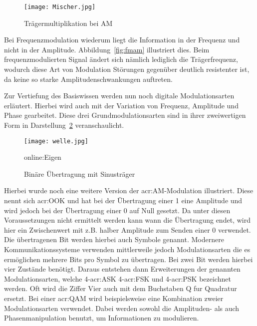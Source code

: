 \begin{figure}[H]
	\centering
	\texttt{[image: Mischer.jpg]}
	\caption[Trägermultiplikation bei AM]{Trägermultiplikation bei AM} 
	\cite{wernerNachrichtentechnikEinfuehrungFuer2010}
	\label{fig:mischer}
\end{figure}

Bei Frequenzmodulation wiederum liegt die Information in der Frequenz und nicht in der Amplitude. Abbildung~\ref{fig:fmam} illustriert dies. Beim frequenzmodulierten Signal ändert sich nämlich lediglich die Trägerfrequenz, wodurch diese Art von Modulation Störungen gegenüber deutlich resistenter ist, da keine so starke Amplitudenschwankungen auftreten.\cite{hoeher}


Zur Vertiefung des Basiswissen werden nun noch digitale Modulationsarten erläutert. Hierbei wird auch mit der Variation von Frequenz, Amplitude und Phase gearbeitet. Diese drei Grundmodulationsarten sind in ihrer zweiwertigen Form in Darstellung~\ref{fig:welle} veranschaulicht.

\begin{figure}[H]
	\centering
	\texttt{[image: welle.jpg]}
	\caption[Binäre Übertragung mit Sinusträger]{Binäre Übertragung mit Sinusträger} 
	\cite{wernerNachrichtentechnikEinfuehrungFuer2010}\gls{online:Eigen}
	\label{fig:welle}
\end{figure}

Hierbei wurde noch eine weitere Version der \gls{acr:AM}-Modulation illustriert. Diese nennt sich \gls{acr:OOK} und hat bei der Übertragung einer 1 eine Amplitude und wird jedoch bei der Übertragung einer 0 auf Null gesetzt. Da unter diesen Voraussetzungen nicht ermittelt werden kann wann die Übertragung endet, wird hier ein Zwischenwert mit z.B. halber Amplitude zum Senden einer 0 verwendet.
Die übertragenen Bit werden hierbei auch Symbole genannt. Modernere Kommunikationssysteme verwenden mittlerweile jedoch Modulationsarten die es ermöglichen mehrere Bits pro Symbol zu übertragen. Bei zwei Bit werden hierbei vier Zustände benötigt. Daraus entstehen dann Erweiterungen der genannten Modulationsarten, welche 4-\gls{acr:ASK} 4-\gls{acr:FSK} und 4-\gls{acr:PSK} bezeichnet werden. Oft wird die Ziffer Vier auch mit dem Buchstaben Q fur Quadratur ersetzt.\cite{howwireless}\cite{butlerWirelessNetworkingDeveloping2013} Bei einer \gls{acr:QAM} wird beispielsweise eine Kombination zweier Modulationsarten verwendet. Dabei werden sowohl die Amplituden- als auch Phasenmanipulation benutzt, um Informationen zu modulieren. 

